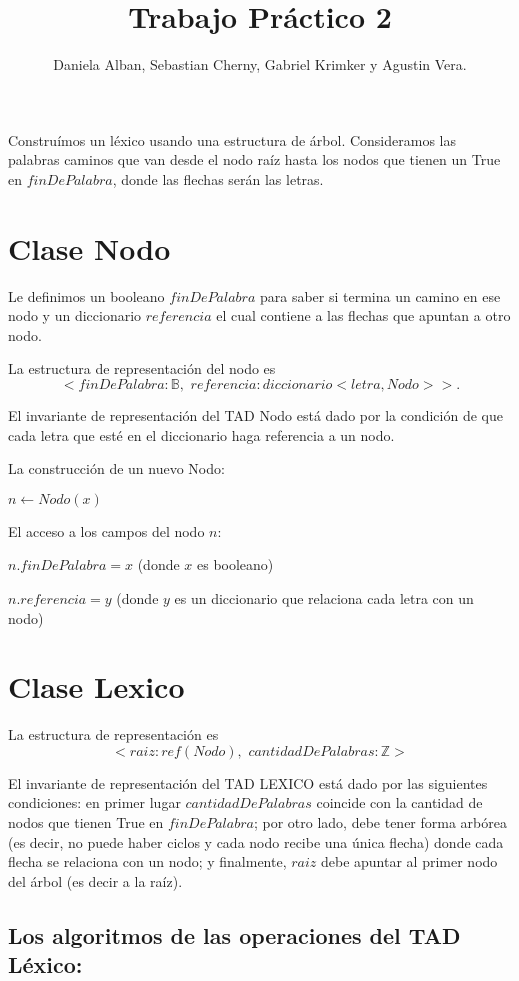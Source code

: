 \documentclass[a4paper]{article}
\title{Trabajo Práctico 2}
\author{Daniela Alban, Sebastian Cherny, Gabriel Krimker y Agustin  Vera.}
\newcommand\ZZ{\mathbb Z}
\newcommand\BB{\mathbb B}
\begin{document}
\maketitle

Construímos un léxico usando una estructura de árbol. Consideramos las palabras caminos que van desde el nodo raíz hasta los nodos que tienen un True en $finDePalabra$, donde las flechas serán las letras.


\section*{Clase Nodo}
Le definimos un booleano $finDePalabra$ para saber si termina un camino en ese nodo y un diccionario $referencia$ el cual contiene a las flechas que apuntan a otro nodo.  

La estructura de representación del nodo es $$< finDePalabra:\BB, \,\, referencia:diccionario <letra, Nodo>>.$$

El invariante de representación del TAD Nodo está dado por la condición de que cada letra que esté en el diccionario haga referencia a un nodo.

La construcción de un nuevo Nodo:

$ n \leftarrow Nodo(x) $

El acceso a los campos del nodo $n$:

$n.finDePalabra=x$ (donde $x$ es booleano)

$n.referencia=y$ (donde $y$ es un diccionario que relaciona cada letra con un nodo)


\section*{Clase Lexico}
La estructura de representación es
$$<raiz:ref(Nodo), \,\, cantidadDePalabras: \ZZ>$$

El invariante de representación del TAD LEXICO está dado por las siguientes condiciones: en primer lugar $cantidadDePalabras$ coincide con la cantidad de nodos que tienen True en $finDePalabra$; por otro lado, debe tener forma arbórea (es decir, no puede haber ciclos y cada nodo recibe una única flecha) donde cada flecha se relaciona con un nodo; y finalmente, $raiz$ debe apuntar al primer nodo del árbol (es decir a la raíz).

\subsection*{Los algoritmos de las operaciones del TAD Léxico:}
\end{document}
